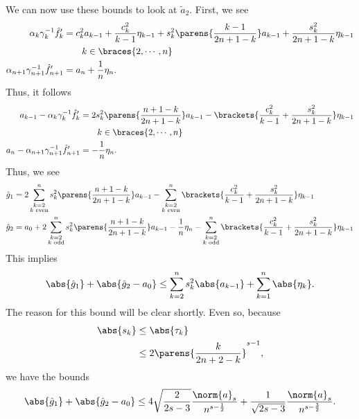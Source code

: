 We can now use these bounds to look at $\tilde{a}_{2}$.
First, we see
%
\begin{align}
    \alpha_{k}\gamma_{k}^{-1}\hat{f}_{k}'
        &= c_{k}^{2}a_{k-1} + \frac{c_{k}^{2}}{k-1}\eta_{k-1}
        + s_{k}^{2}\parens{\frac{k-1}{2n+1-k}}a_{k-1}
        + \frac{s_{k}^{2}}{2n+1-k}\eta_{k-1} \nonumber\\
    &\qquad k\in\braces{2,\cdots,n} \nonumber\\
    \alpha_{n+1}\gamma_{n+1}^{-1}\hat{f}_{n+1}' &= a_{n} + \frac{1}{n}\eta_{n}.
\end{align}
%
Thus, it follows
%
\begin{align}
    a_{k-1} - \alpha_{k}\gamma_{k}^{-1}\hat{f}_{k}' &=
        2s_{k}^{2}\parens{\frac{n+1-k}{2n+1-k}}a_{k-1}
        - \brackets{\frac{c_{k}^{2}}{k-1} + \frac{s_{k}^{2}}{2n+1-k}}\eta_{k-1}
        \nonumber\\
    &\qquad k\in\braces{2,\cdots,n} \nonumber\\
    a_{n} - \alpha_{n+1}\gamma_{n+1}^{-1}\hat{f}_{n+1}' &=
        -\frac{1}{n}\eta_{n}.
\end{align}
%
Thus, we see
%
\begin{align}
    \hat{g}_{1} &= 2\sum_{\substack{k=2\\k\text{ even}}}^{n}
        s_{k}^{2}\parens{\frac{n+1-k}{2n+1-k}}a_{k-1}
        - \sum_{\substack{k=2\\k\text{ even}}}^{n}
        \brackets{\frac{c_{k}^{2}}{k-1} + \frac{s_{k}^{2}}{2n+1-k}}\eta_{k-1}
        \nonumber\\
    \hat{g}_{2} &= a_{0} + 2\sum_{\substack{k=2\\k\text{ odd}}}^{n}
        s_{k}^{2}\parens{\frac{n+1-k}{2n+1-k}}a_{k-1}
        - \frac{1}{n}\eta_{n} 
        - \sum_{\substack{k=2\\k\text{ odd}}}^{n} 
        \brackets{\frac{c_{k}^{2}}{k-1} + \frac{s_{k}^{2}}{2n+1-k}}\eta_{k-1}
\end{align}
%
This implies
%
\begin{equation}
    \abs{\hat{g}_{1}} + \abs{\hat{g}_{2} - a_{0}} \le
        \sum_{k=2}^{n}s_{k}^{2}\abs{a_{k-1}} + \sum_{k=1}^{n}\abs{\eta_{k}}.
\end{equation}
%
The reason for this bound will be clear shortly. Even so,
because
%
\begin{align}
    \abs{s_{k}} &\le \abs{\tau_{k}} \nonumber\\
        &\le 2\parens{\frac{k}{2n+2-k}}^{s-1},
\end{align}
%
we have the bounds
%
\begin{equation}
    \abs{\hat{g}_{1}} + \abs{\hat{g}_{2} - a_{0}} \le
        4\sqrt{\frac{2}{2s-3}}\frac{\norm{a}_{s}}{n^{s-\frac{1}{2}}}
        + \frac{1}{\sqrt{2s-3}}\frac{\norm{a}_{s}}{n^{s-\frac{3}{2}}}.
\end{equation}

